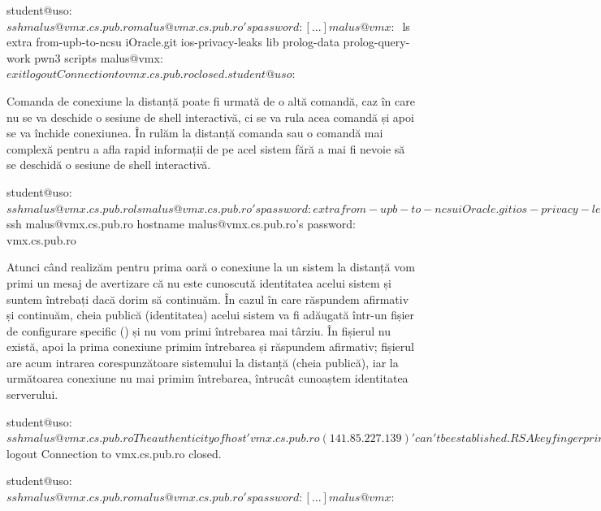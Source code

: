 \begin{screen}[caption={Acces shell la distanță folosind SSH},label={lst:sec:ssh-shell}]
student@uso:~$ ssh malus@vmx.cs.pub.ro
malus@vmx.cs.pub.ro's password:
[...]
malus@vmx:~$ ls
extra  from-upb-to-ncsu  iOracle.git  ios-privacy-leaks  lib  prolog-data  prolog-query-work  pwn3  scripts
malus@vmx:~$ exit
logout
Connection to vmx.cs.pub.ro closed.
student@uso:~$
\end{screen}

Comanda de conexiune la distanță poate fi urmată de o altă comandă, caz în care nu se va deschide o sesiune de shell interactivă, ci se va rula acea comandă și apoi se va închide conexiunea.
În  rulăm la distanță comanda  sau o comandă mai complexă pentru a afla rapid informații de pe acel sistem fără a mai fi nevoie să se deschidă o sesiune de shell interactivă.

\begin{screen}[caption={Rulare comenzi la distanță prin SSH},label={lst:sec:ssh-commands}]
student@uso:~$ ssh malus@vmx.cs.pub.ro ls
malus@vmx.cs.pub.ro's password:
extra
from-upb-to-ncsu
iOracle.git
ios-privacy-leaks
lib
prolog-data
prolog-query-work
pwn3
scripts
student@uso:~$ ssh malus@vmx.cs.pub.ro hostname
malus@vmx.cs.pub.ro's password:
vmx.cs.pub.ro
\end{screen}

Atunci când realizăm pentru prima oară o conexiune la un sistem la distanță vom primi un mesaj de avertizare că nu este cunoscută identitatea acelui sistem și suntem întrebați dacă dorim să continuăm.
În cazul în care răspundem afirmativ și continuăm, cheia publică (identitatea) acelui sistem va fi adăugată într-un fișier de configurare specific () și nu vom primi întrebarea mai târziu.
În  fișierul  nu există, apoi la prima conexiune primim întrebarea și răspundem afirmativ;
fișierul  are acum intrarea corespunzătoare sistemului la distanță (cheia publică), iar la următoarea conexiune nu mai primim întrebarea, întrucât cunoaștem identitatea serverului.

\begin{screen}[caption={Verificarea identității serverului prin SSH},label={lst:sec:ssh-host-check}]
student@uso:~$ ssh malus@vmx.cs.pub.ro
The authenticity of host 'vmx.cs.pub.ro (141.85.227.139)' can't be established.
RSA key fingerprint is SHA256:CrRMD7nrflw7/KEZ4z7lksvEd8tXxkjuVXoBqsG5Vdc.
Are you sure you want to continue connecting (yes/no)? yes
Warning: Permanently added 'vmx.cs.pub.ro,141.85.227.139' (RSA) to the list of known hosts.
malus@vmx.cs.pub.ro's password:
[...]
malus@vmx:~$ logout
Connection to vmx.cs.pub.ro closed.

student@uso:~$ ssh malus@vmx.cs.pub.ro
malus@vmx.cs.pub.ro's password:
[...]
malus@vmx:~$
\end{screen}

